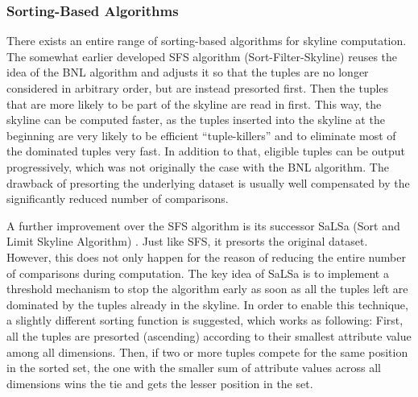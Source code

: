 \subsubsection{Sorting-Based Algorithms} \label{subsection:sorting-based-algorithms}
There exists an entire range of sorting-based algorithms for skyline computation. The somewhat earlier developed SFS algorithm (Sort-Filter-Skyline) \cite{sfs} reuses the idea of the BNL algorithm and adjusts it so that the tuples are no longer considered in arbitrary order, but are instead presorted first. Then the tuples that are more likely to be part of the skyline are read in first. This way, the skyline can be computed faster, as the tuples inserted into the skyline at the beginning are very likely to be efficient ``tuple-killers'' and to eliminate most of the dominated tuples very fast. In addition to that, eligible tuples can be output progressively, which was not originally the case with the BNL algorithm. The drawback of presorting the underlying dataset is usually well compensated by the significantly reduced number of comparisons. 


A further improvement over the SFS algorithm is its successor SaLSa (Sort and Limit Skyline Algorithm) \cite{salsa}. Just like SFS, it presorts the original dataset. However, this does not only happen for the reason of reducing the entire number of comparisons during computation. The key idea of SaLSa is to implement a threshold mechanism to stop the algorithm early as soon as all the tuples left are dominated by the tuples already in the skyline. In order to enable this technique, a slightly different sorting function is suggested, which works as following: First, all the tuples are presorted (ascending) according to their smallest attribute value among all dimensions. Then, if two or more tuples compete for the same position in the sorted set, the one with the smaller sum of attribute values across all dimensions wins the tie and gets the lesser position in the set. 

